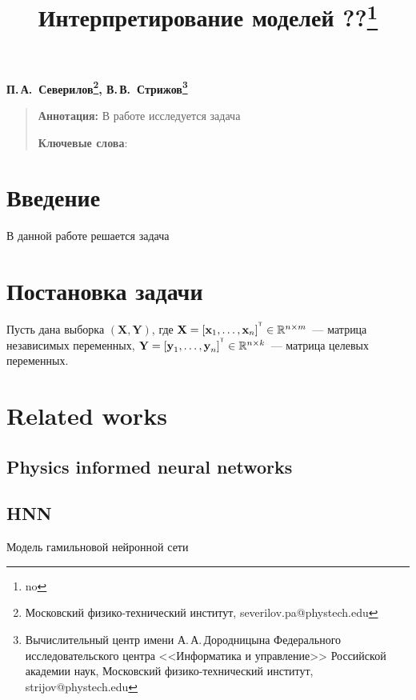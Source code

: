 \documentclass[12pt]{article}
\newcommand{\bY}{\mathbf{Y}}
\newcommand{\bX}{\mathbf{X}}
\newcommand{\T}{^{\text{\tiny\sffamily\upshape\mdseries T}}}
\begin{document}
	\title{Интерпретирование моделей ??\thanks{no}}
	\date{}
	\author{}
	\maketitle
	
	\begin{center}
		\bf
		П.\,А.~Северилов\footnote{Московский физико-технический институт, severilov.pa@phystech.edu}, 
		В.\,В.~Стрижов\footnote{Вычислительный центр имени А.\,А.\,Дородницына Федерального исследовательского центра <<Информатика и управление>> Российской академии наук, Московский физико-технический институт, strijov@phystech.edu}
	\end{center}
	{\begin{quote}
			\textbf{Аннотация:}
			В работе исследуется задача 
			
			\smallskip
			\textbf{Ключевые слова}: 
			\smallskip
			
		\end{quote}
	}

	
	\section{Введение}
	В данной работе решается задача 
	
	\section{Постановка задачи}
	
	Пусть дана выборка $(\bX, \bY)$, где $\textbf{X} = [\textbf{x}_1, \dots, \textbf{x}_{n}]^{\T} \in \mathbb{R}^{n \times m}$~--- матрица независимых переменных, $\textbf{Y} = [\textbf{y}_1, \dots, \textbf{y}_n]^{\T} \in \mathbb{R}^{n \times k}$~--- матрица целевых переменных.
	
	\section{Related works}
	\subsection{Physics informed neural networks}
	\subsection{HNN}
	Модель гамильновой нейронной сети \cite{NEURIPS2019_26cd8eca}
	
\end{document}
